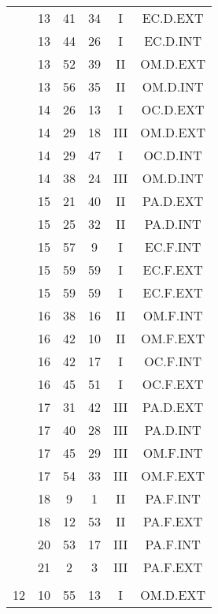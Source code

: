 \documentclass[12pt, a4paper]{article}
\begin{document}
\begin{multicols}{3}
{\begin{tabular}{c c c c c c}
	 	 	 	 & 13 & 41 & 34 & I & EC.D.EXT\\%
	 	 	 	 & 13 & 44 & 26 & I & EC.D.INT\\%
	 	 	 	 & 13 & 52 & 39 & II & OM.D.EXT\\%
	 	 	 	 & 13 & 56 & 35 & II & OM.D.INT\\%
	 	 	 	 & 14 & 26 & 13 & I & OC.D.EXT\\%
	 	 	 	 & 14 & 29 & 18 & III & OM.D.EXT\\%
	 	 	 	 & 14 & 29 & 47 & I & OC.D.INT\\%
	 	 	 	 & 14 & 38 & 24 & III & OM.D.INT\\%
	 	 	 	 & 15 & 21 & 40 & II & PA.D.EXT\\%
	 	 	 	 & 15 & 25 & 32 & II & PA.D.INT\\%
	 	 	 	 & 15 & 57 & 9 & I & EC.F.INT\\%
	 	 	 	 & 15 & 59 & 59 & I & EC.F.EXT\\%
	 	 	 	 & 15 & 59 & 59 & I & EC.F.EXT\\%
	 	 	 	 & 16 & 38 & 16 & II & OM.F.INT\\%
	 	 	 	 & 16 & 42 & 10 & II & OM.F.EXT\\%
	 	 	 	 & 16 & 42 & 17 & I & OC.F.INT\\%
	 	 	 	 & 16 & 45 & 51 & I & OC.F.EXT\\%
	 	 	 	 & 17 & 31 & 42 & III & PA.D.EXT\\%
	 	 	 	 & 17 & 40 & 28 & III & PA.D.INT\\%
	 	 	 	 & 17 & 45 & 29 & III & OM.F.INT\\%
	 	 	 	 & 17 & 54 & 33 & III & OM.F.EXT\\%
	 	 	 	 & 18 & 9 & 1 & II & PA.F.INT\\%
	 	 	 	 & 18 & 12 & 53 & II & PA.F.EXT\\%
	 	 	 	 & 20 & 53 & 17 & III & PA.F.INT\\%
	 	 	 	 & 21 & 2 & 3 & III & PA.F.EXT\\%
	 	 	 	 & & & & & \\%
	 	 	 	12 & 10 & 55 & 13 & I & OM.D.EXT\\%
	 	 \end{tabular}
 	}
\end{multicols}
\end{document}
